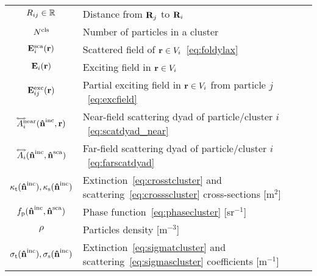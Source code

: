 \begin{table}[t]
\begin{tabular}{cl}
        $R_{ij}\in\mathbb{R}$ & Distance from $\mathbf{R}_j$ to $\mathbf{R}_i$\\
        ${N^\text{cls}}$ & Number of particles in a cluster \\
        \hline
        $\mathbf{E}^\text{sca}_i(\mathbf{r})$ & Scattered field of $\mathbf{r}\in V_i$~\eqref{eq:foldylax}\\
        $\mathbf{E}_i(\mathbf{r})$ & Exciting field in $\mathbf{r}\in V_i$ \\
        $\mathbf{E}^\text{exc}_{ij}(\mathbf{r})$ & Partial exciting field in $\mathbf{r}\in V_i$ from particle $j$~\eqref{eq:excfield} \\
        $\accentset{\Longleftrightarrow}{A}_i^\text{near}(\mathbf{\hat{n}}^{\text{inc}},\mathbf{r})$ & Near-field scattering dyad of particle/cluster $i$~\eqref{eq:scatdyad_near} \\
        $\accentset{\Longleftrightarrow}{A}_i(\mathbf{\hat{n}}^{\text{inc}},\mathbf{\hat{n}}^{\text{sca}})$ & Far-field scattering dyad of particle/cluster $i$~\eqref{eq:farscatdyad} \\
        \hline
        \hline
        $\kappa_\mathrm{t}(\mathbf{\hat{n}}^{\text{inc}}),\kappa_\mathrm{s}(\mathbf{\hat{n}}^{\text{inc}})$ & Extinction~\eqref{eq:crosstcluster} and scattering~\eqref{eq:crossscluster} cross-sections [m$^{2}$]\\
        $f_\mathrm{p}(\mathbf{\hat{n}}^{\text{inc}},\mathbf{\hat{n}}^{\text{sca}})$ & Phase function~\eqref{eq:phasecluster} [sr$^{-1}$]\\
        $\rho$ & Particles density [m$^{-3}$] \\
        $\sigma_\mathrm{t}(\mathbf{\hat{n}}^{\text{inc}}),\sigma_\mathrm{s}(\mathbf{\hat{n}}^{\text{inc}})$ & Extinction~\eqref{eq:sigmatcluster} and scattering~\eqref{eq:sigmascluster} coefficients [m$^{-1}$]\\
        \bottomrule
    \end{tabular}
\end{table}